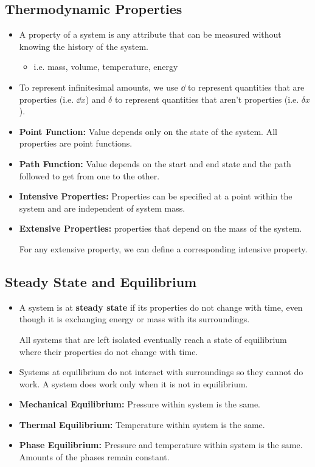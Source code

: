 \subsection{Thermodynamic Properties}
\begin{itemize}
    \item A property of a system is any attribute that can be measured without knowing the history of the system.
    \begin{itemize}
        \item i.e. mass, volume, temperature, energy
    \end{itemize}
    \item To represent infinitesimal amounts, we use $\dd$ to represent quantities that are properties (i.e. $\dd{x}$) and  $\delta$ to represent quantities that aren't properties (i.e. $\delta x$).
    \item \textbf{Point Function:} Value depends only on the state of the system. All properties are point functions.
    \item \textbf{Path Function:} Value depends on the start and end state and the path followed to get from one to the other.
    \item \textbf{Intensive Properties:} Properties can be specified at a point within the system and are independent of system mass.
    \item \textbf{Extensive Properties:} properties that depend on the mass of the system.
    \begin{idea}
        For any extensive property, we can define a corresponding intensive property.
    \end{idea}
\end{itemize}
\subsection{Steady State and Equilibrium}
\begin{itemize}
    \item A system is at \textbf{steady state} if its properties do not change with time, even though it is exchanging energy or mass with its surroundings.
    \begin{idea}
        All systems that are left isolated eventually reach a state of equilibrium where their properties do not change with time.
    \end{idea}
    \item Systems at equilibrium do not interact with surroundings so they cannot do work. A system does work only when it is not in equilibrium.
    \item \textbf{Mechanical Equilibrium:} Pressure within system is the same.
    \item \textbf{Thermal Equilibrium:} Temperature within system is the same.
    \item \textbf{Phase Equilibrium:} Pressure and temperature within system is the same. Amounts of the phases remain constant.
\end{itemize}
